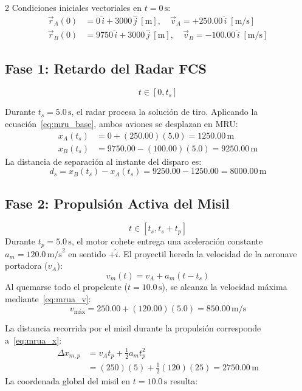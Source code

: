 \documentclass[11pt,letterpaper]{article}
\begin{document}
\begin{multicols}{2}
Condiciones iniciales vectoriales en $t=0\,\text{s}$:
\begin{align*}
    \vec{r}_A(0) &= 0\,\hat{i} + 3000\,\hat{j}\;[\text{m}], \quad \vec{v}_A = +250.00\,\hat{i}\;[\text{m/s}] \\
    \vec{r}_B(0) &= 9750\,\hat{i} + 3000\,\hat{j}\;[\text{m}], \quad \vec{v}_B = -100.00\,\hat{i}\;[\text{m/s}]
\end{align*}

\subsection{Fase 1: Retardo del Radar FCS}
$$t \in [0, t_s]$$

Durante $t_s = 5.0\,\text{s}$, el radar procesa la solución de tiro. Aplicando la ecuación~\eqref{eq:mru_base}, ambos aviones se desplazan en MRU:
\begin{align}
    x_A(t_s) &= 0 + (250.00)(5.0) = 1250.00\,\text{m} \label{eq:pos_xa_ts}\\
    x_B(t_s) &= 9750.00 - (100.00)(5.0) = 9250.00\,\text{m} \label{eq:pos_xb_ts}
\end{align}
La distancia de separación al instante del disparo es:
\begin{equation}
    d_s = x_B(t_s) - x_A(t_s) = 9250.00 - 1250.00 = 8000.00\,\text{m} \label{eq:ds}
\end{equation}

\subsection{Fase 2: Propulsión Activa del Misil}

$$t \in [t_s, t_s + t_p]$$
Durante $t_p = 5.0\,\text{s}$, el motor cohete entrega una aceleración constante $a_m = 120.0\,\text{m/s}^2$ en sentido $+\hat{i}$. El proyectil hereda la velocidad de la aeronave portadora ($v_A$):
\begin{equation}
    v_m(t) = v_A + a_m(t - t_s) \label{eq:vel_misil_prop}
\end{equation}
Al quemarse todo el propelente ($t = 10.0\,\text{s}$), se alcanza la velocidad máxima mediante~\eqref{eq:mrua_v}:
\begin{equation}
    v_{\text{máx}} = 250.00 + (120.00)(5.0) = 850.00\,\text{m/s} \label{eq:vmax}
\end{equation}

La distancia recorrida por el misil durante la propulsión corresponde a~\eqref{eq:mrua_x}:
\begin{align}
    \Delta x_{m,p} &= v_A t_p + \frac{1}{2}a_m t_p^2 \nonumber \\
    &= (250)(5) + \frac{1}{2}(120)(25) = 2750.00\,\text{m} \label{eq:dx_prop}
\end{align}
La coordenada global del misil en $t = 10.0\,\text{s}$ resulta:


\end{multicols}
\end{document}

